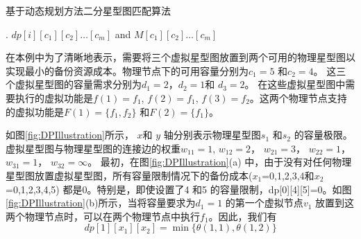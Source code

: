 \begin{algorithm}[htbp]
\label{alg:DPAlg}
\caption{基于动态规划方法二分星型图匹配算法}
\begin{algorithmic}[1]


.
\ENDFOR
\ENDFOR
\RETURN $dp[i][{c_1}][{c_2}] \ldots [{c_m}]$ and $M[{c_1}][{c_2}] \ldots [{c_m}]$
\end{algorithmic}
\end{algorithm}

在本例中为了清晰地表示，需要将三个虚拟星型图放置到两个可用的物理星型图以实现最小的备份资源成本。物理节点下的可用容量分别为$c_1=5$ 和$c_2=4$。 这三个虚拟星型图的容量需求分别为$d_1=2$，$d_2=1$和 $d_3=2$。 在这些虚拟星型图中需要执行的虚拟功能是$f(1)=f_1$, $f(2)=f_1$, $f(3)=f_2$。这两个物理节点支持的虚拟功能是$F(1)=\{f_1,f_2\}$ 和$F(2)=\{f_1\}$。

如图\ref{fig:DPIllustration}所示， $x$和 $y$ 轴分别表示物理星型图$s_1$ 和$s_2$ 的容量极限。虚拟星型图与物理星型图的连接边的权重$w_{11}=1$, $w_{12}=2$， $w_{21}=3$， $w_{22}=1$， $w_{31}=1$， $w_{32}=\infty$。 最初，在图\ref{fig:DPIllustration}(a) 中，由于没有对任何物理星型图放置虚拟星型图，所有容量限制情况下的备份成本($x_1$=0,1,2,3,4和$x_2$=0,1,2,3,4,5) 都是0。特别是，即使设置了4 和5 的容量限制，dp[0][4][5]=0。如图\ref{fig:DPIllustration}(b)所示，当将容量要求为$d_1=1$ 的第一个虚拟节点$v_1$ 放置到这两个物理节点时，可以在两个物理节点中执行$f_1$。因此，我们有
\begin{equation}
dp[1][{x_1}][{x_2}] = \min \{\theta (1,1),\theta (1,2)\}
\end{equation}

